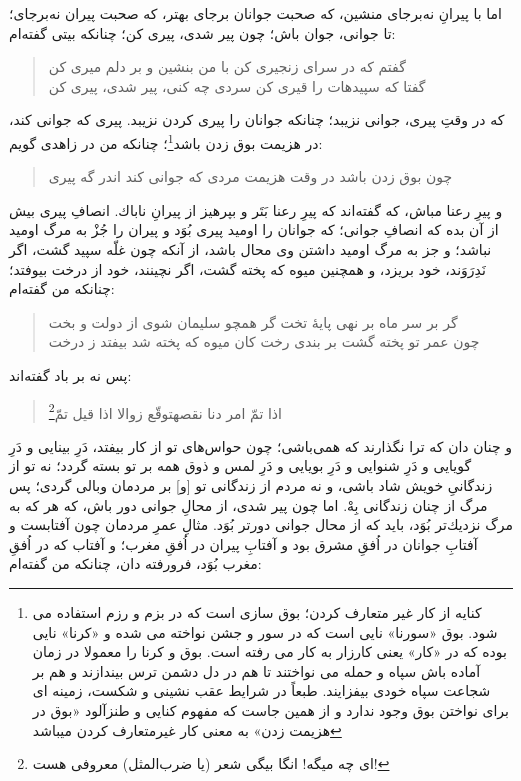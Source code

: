 اما با پيرانِ نه‌بر‌جاى منشين، كه صحبت جوانان بر‌جاى بهتر، كه صحبت پيران نه‌بر‌جاى؛ تا جوانى، جوان باش؛ چون پير شدى، پيرى كن؛ چنانكه بيتى گفته‌ام:

\begin{quote}
\centering
گفتم كه در سراى زنجيرى كن \quad \quad 
با من بنشين و بر دلم ميرى كن\\
گفتا كه سپيدهات را قيرى كن \quad \quad
سردى چه كنى، پير شدى، پيرى كن
\end{quote}
كه در وقتِ پيرى، جوانى نزيبد؛ چنانكه جوانان را پيرى كردن نزيبد. پيرى كه جوانى كند، در هزيمت بوق زدن باشد\footnote{کنایه از کار غیر متعارف کردن؛ بوق سازی است که در بزم  و رزم استفاده می شود. بوق «سورنا» نایی است که در سور و جشن نواخته می شده و «کرنا» نایی بوده که در «کار» یعنی کارزار به کار می رفته است. بوق و کرنا را معمولا در زمان آماده باش سپاه و حمله می نواختند تا هم در دل دشمن ترس بیندازند و هم بر شجاعت سپاه خودی بیفزایند. طبعاً در شرایط عقب نشینی و شکست، زمینه ای برای نواختن بوق وجود ندارد و از همین جاست که مفهوم کنایی و طنزآلود «بوق در هزیمت زدن» به معنی کار غیرمتعارف کردن میباشد}؛ چنانكه من در زاهدى گويم:

\begin{quote}
\centering
چون بوق زدن باشد در وقت هزيمت \quad \quad 
مردى كه جوانى كند اندر گه پيرى
\end{quote}

و پيرِ رعنا مباش، كه گفته‌اند كه پيرِ رعنا بَتَر و بپرهيز از پيرانِ ناباك.
انصافِ پيرى بيش از آن بده كه انصافِ جوانى؛ كه جوانان را اوميد پيرى بُوَد و پيران را جُزْ به مرگ اوميد نباشد؛ و جز به مرگ اوميد داشتن وى محال باشد، از آنكه چون غلّه سپيد گشت، اگر نَدِرَوَند، خود بريزد، و همچنين ميوه كه پخته گشت، اگر نچينند، خود از درخت بيوفتد؛ چنانكه من گفته‌ام:


\begin{quote}
\centering
گر بر سر ماه بر نهى پايۀ تخت \quad \quad 
گر همچو سليمان شوى از دولت و بخت \\ 
چون عمر تو پخته گشت بر بندى رخت \quad \quad 
كان ميوه كه پخته شد بيفتد ز درخت
\end{quote}

پس نه بر باد گفته‌اند: 

\begin{quote}
\centering
اذا تمّ امر دنا نقصه\quad \quad  توقّع زوالا اذا قيل تمّ\footnote{ای چه میگه! انگا بیگی شعر (یا ضرب‌المثل) معروفی هست!}
\end{quote}

و چنان دان كه ترا نگذارند كه همى‌باشى؛ چون حواس‌هاى تو از كار بيفتد، دَرِ بينايى و دَرِ گويايى و دَرِ شنوايى و دَرِ بويايى و دَرِ لمس و ذوق همه بر تو بسته گردد؛ نه تو از زندگانیِ خويش شاد باشى، و نه مردم از زندگانى تو [و] بر مردمان وبالى گردى؛ پس مرگ از چنان زندگانى بِهْ. اما چون پير شدى، از محالِ جوانى دور باش، كه هر كه به مرگ نزديك‌تر بُوَد، بايد كه از محال جوانى دورتر بُوَد. مثالِ عمرِ مردمان چون آفتابست و آفتابِ جوانان در اُفقِ مشرق بود و آفتابِ پيران در اُفقِ مغرب؛ و آفتاب كه در اُفقِ مغرب بُوَد، فرو‌رفته دان، چنانكه من گفته‌ام:

